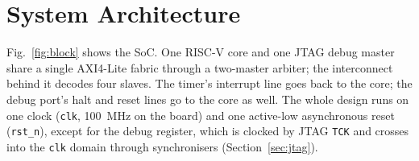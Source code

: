 \documentclass[journal,10pt]{IEEEtran}
\newcommand{\reg}[1]{\texttt{#1}}
\begin{document}
\section{System Architecture}\label{sec:arch}
Fig.~\ref{fig:block} shows the SoC. One RISC-V core and one JTAG debug
master share a single AXI4-Lite fabric through a two-master arbiter; the
interconnect behind it decodes four slaves. The timer's interrupt line goes
back to the core; the debug port's halt and reset lines go to the core as
well. The whole design runs on one clock (\reg{clk}, 100~MHz on the board)
and one active-low asynchronous reset (\reg{rst\_n}), except for the debug
register, which is clocked by JTAG \reg{TCK} and crosses into the \reg{clk}
domain through synchronisers (Section~\ref{sec:jtag}).
\end{document}

